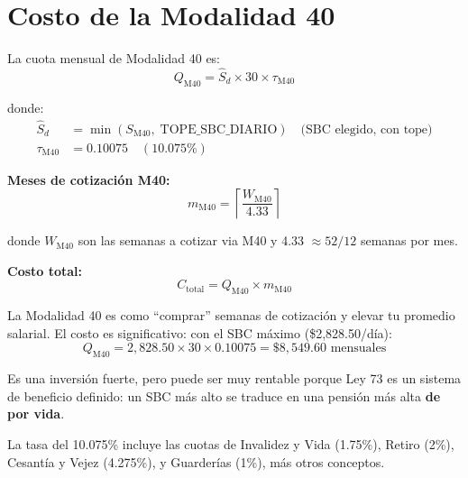 \documentclass[11pt,a4paper]{report}
\theoremstyle{remark}
\begin{document}
\section{Costo de la Modalidad 40}

\begin{tcolorbox}[colback=blue!5!white, colframe=blue!75!black, title=\textbf{Definici\'on Formal}]
La cuota mensual de Modalidad 40 es:
\begin{equation}
Q_{\text{M40}} = \hat{S}_d \times 30 \times \tau_{\text{M40}}
\label{eq:cuota_m40}
\end{equation}

donde:
\begin{align}
\hat{S}_d &= \min(S_{\text{M40}}, \; \text{TOPE\_SBC\_DIARIO}) \quad \text{(SBC elegido, con tope)} \\
\tau_{\text{M40}} &= 0.10075 \quad (10.075\%)
\end{align}

\textbf{Meses de cotizaci\'on M40:}
\begin{equation}
m_{\text{M40}} = \left\lceil \frac{W_{\text{M40}}}{4.33} \right\rceil
\label{eq:meses_m40}
\end{equation}

donde $W_{\text{M40}}$ son las semanas a cotizar via M40 y 4.33 $\approx 52/12$ semanas por mes.

\textbf{Costo total:}
\begin{equation}
C_{\text{total}} = Q_{\text{M40}} \times m_{\text{M40}}
\label{eq:costo_total_m40}
\end{equation}
\end{tcolorbox}

\begin{tcolorbox}[colback=green!5!white, colframe=green!50!black, title=\textbf{Intuici\'on}]
La Modalidad 40 es como ``comprar'' semanas de cotizaci\'on y elevar tu promedio salarial. El costo es significativo: con el SBC m\'aximo (\$2,828.50/d\'ia):
\[
Q_{\text{M40}} = 2{,}828.50 \times 30 \times 0.10075 = \$8{,}549.60 \text{ mensuales}
\]

Es una inversi\'on fuerte, pero puede ser muy rentable porque Ley 73 es un sistema de beneficio definido: un SBC m\'as alto se traduce en una pensi\'on m\'as alta \textbf{de por vida}.

La tasa del 10.075\% incluye las cuotas de Invalidez y Vida (1.75\%), Retiro (2\%), Cesant\'ia y Vejez (4.275\%), y Guarder\'ias (1\%), m\'as otros conceptos.
\end{tcolorbox}
\end{document}
